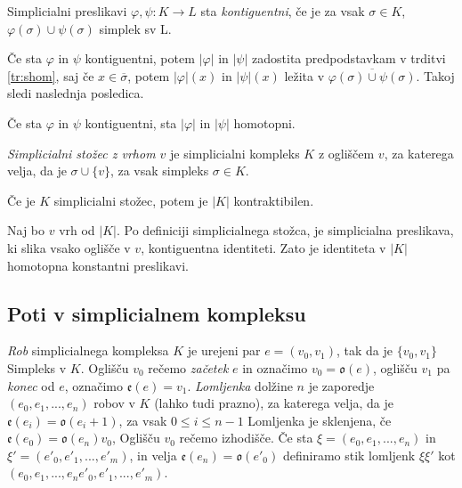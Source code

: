 \documentclass[mat1]{fmfdelo}
\begin{document}
\begin{definicija}
    Simplicialni preslikavi $\varphi, \psi:K\rightarrow L$ sta \textit{kontiguentni}, če je za vsak $\sigma \in K$, $\varphi(\sigma)\cup \psi(\sigma)$ simplek sv L.
\end{definicija}

Če sta $\varphi$ in $\psi$ kontiguentni, potem $|\varphi|$ in $|\psi|$ zadostita predpodstavkam v trditvi \ref{tr:shom}, saj če $x\in \overline{\sigma}$, potem $|\varphi|(x)$ in $|\psi|(x)$ ležita v $\overline{\varphi(\sigma)\cup\psi(\sigma)}$. Takoj sledi naslednja posledica.

\begin{posledica}
    Če sta $\varphi$ in $\psi$ kontiguentni, sta $|\varphi|$ in $|\psi|$ homotopni.
\end{posledica}

\textit{Simplicialni stožec z vrhom $v$} je simplicialni kompleks $K$ z ogliščem $v$, za katerega velja, da je $\sigma \cup \{v\}$, za vsak simpleks $\sigma\in K$.

\begin{posledica}
    \label{pos:kontr}
    Če je $K$ simplicialni stožec, potem je $|K|$ kontraktibilen.
\end{posledica}

\begin{dokaz}
    Naj bo $v$ vrh od $|K|$. Po definiciji simplicialnega stožca, je simplicialna preslikava, ki slika vsako oglišče v $v$, kontiguentna identiteti. Zato je identiteta v $|K|$ homotopna konstantni preslikavi.
\end{dokaz}


\subsection{Poti v simplicialnem kompleksu}

\textit{Rob} simplicialnega kompleksa $K$ je urejeni par $e=(v_0,v_1)$, tak da je $\{v_0,v_1\}$ Simpleks v $K$. Oglišču $v_0$ rečemo \textit{začetek} $e$ in označimo 
$v_0=\mathfrak{o}(e)$, oglišču $v_1$ pa \textit{konec} od $e$, 
označimo $\mathfrak{e}(e)=v_1$. \textit{Lomljenka} dolžine $n$ je zaporedje
$(e_0,e_1,...,e_{n})$ robov v $K$ (lahko tudi prazno), za katerega velja, da je $\mathfrak{e}(e_i)=\mathfrak{o}(e_i+1)$, za vsak $0\leq i \leq n-1$
Lomljenka je sklenjena, če $\mathfrak{e}(e_0)=\mathfrak{o}(e_n)v_0$, Oglišču $v_0$ rečemo izhodišče. Če sta $\xi =(e_0,e_1,...,e_n)$ in $\xi'=(e'_0,e'_1,...,e'_{m})$, in velja $\mathfrak{e}(e_n)=\mathfrak{o}(e'_0)$ definiramo stik lomljenk $\xi\xi'$ kot $(e_0,e_1,...,e_{n}e'_0,e'_1,...,e'_{m})$.
\end{document}
